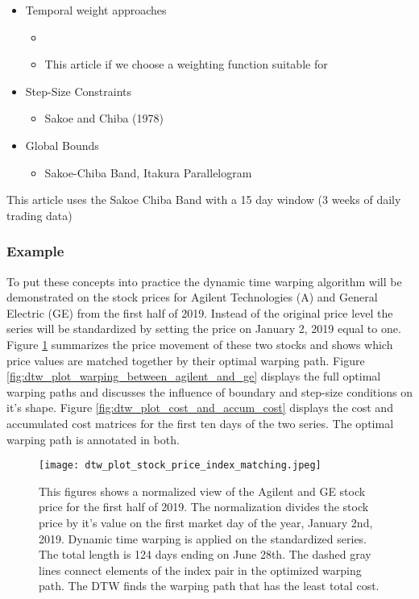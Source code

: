 \documentclass[12pt]{article}
\begin{document}
\begin{itemize}
    \item Temporal weight approaches
        \begin{itemize}
            \item \parencite{JEONG20112231}
            \item This article if we choose a weighting function suitable for 
        \end{itemize}
    \item Step-Size Constraints
        \begin{itemize}
            \item Sakoe and Chiba (1978)
        \end{itemize}
    \item Global Bounds
        \begin{itemize}
            \item Sakoe-Chiba Band, Itakura Parallelogram
        \end{itemize}
\end{itemize}

This article uses the Sakoe Chiba Band with a 15 day window (3 weeks of daily trading data)

\subsubsection{Example}

To put these concepts into practice the dynamic time warping algorithm will be demonstrated on the stock prices for Agilent Technologies (A) and General Electric (GE) from the first half of 2019. Instead of the original price level the series will be standardized by setting the price on January 2, 2019 equal to one. Figure \ref{fig:dtw_plot_stock_price_index_matching} summarizes the price movement of these two stocks and shows which price values are matched together by their optimal warping path. Figure \ref{fig:dtw_plot_warping_between_agilent_and_ge} displays the full optimal warping paths and discusses the influence of boundary and step-size conditions on it's shape. Figure \ref{fig:dtw_plot_cost_and_accum_cost} displays the cost and accumulated cost matrices for the first ten days of the two series. The optimal warping path is annotated in both.

\begin{figure}
    \centering
    \texttt{[image: dtw\_plot\_stock\_price\_index\_matching.jpeg]}
    \caption{This figures shows a normalized view of the Agilent and GE stock price for the first half of 2019. The normalization divides the stock price by it's value on the first market day of the year, January 2nd, 2019. Dynamic time warping is applied on the standardized series. The total length is 124 days ending on June 28th. The dashed gray lines connect elements of the index pair in the optimized warping path. The DTW finds the warping path that has the least total cost.}
    \label{fig:dtw_plot_stock_price_index_matching}
\end{figure}
\end{document}
